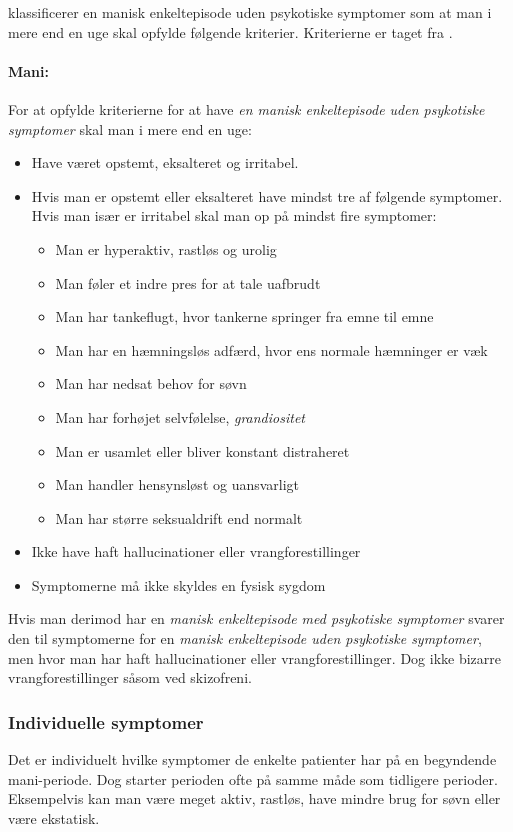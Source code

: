 \citet{misc:netpsykmani} klassificerer en manisk enkeltepisode uden psykotiske symptomer som at man i mere end en uge skal opfylde følgende kriterier.
Kriterierne er taget fra \citet{misc:netpsykmani}.
\begin{mdframed}
\paragraph{Mani:}
For at opfylde kriterierne for at have \textit{en manisk enkeltepisode uden psykotiske symptomer} skal man i mere end en uge:
\begin{itemize}
	\item Have været opstemt, eksalteret og irritabel.
	\item Hvis man er opstemt eller eksalteret have mindst tre af følgende symptomer. Hvis man især er irritabel skal man op på mindst fire symptomer:
	\begin{itemize}
		\item Man er hyperaktiv, rastløs og urolig
		\item Man føler et indre pres for at tale uafbrudt
		\item Man har tankeflugt, hvor tankerne springer fra emne til emne
		\item Man har en hæmningsløs adfærd, hvor ens normale hæmninger er væk
		\item Man har nedsat behov for søvn
		\item Man har forhøjet selvfølelse, \textit{grandiositet}
		\item Man er usamlet eller bliver konstant distraheret
		\item Man handler hensynsløst og uansvarligt
		\item Man har større seksualdrift end normalt
	\end{itemize}
	\item Ikke have haft hallucinationer eller vrangforestillinger
	\item Symptomerne må ikke skyldes en fysisk sygdom
\end{itemize}
\end{mdframed}
Hvis man derimod har en \textit{manisk enkeltepisode med psykotiske symptomer} svarer den til symptomerne for en \textit{manisk enkeltepisode uden psykotiske symptomer}, men hvor man har haft hallucinationer eller vrangforestillinger. Dog ikke bizarre vrangforestillinger såsom ved skizofreni.

\subsubsection{Individuelle symptomer}
Det er individuelt hvilke symptomer de enkelte patienter har på en begyndende mani-periode.
Dog starter perioden ofte på samme måde som tidligere perioder.
Eksempelvis kan man være meget aktiv, rastløs, have mindre brug for søvn eller være ekstatisk.

